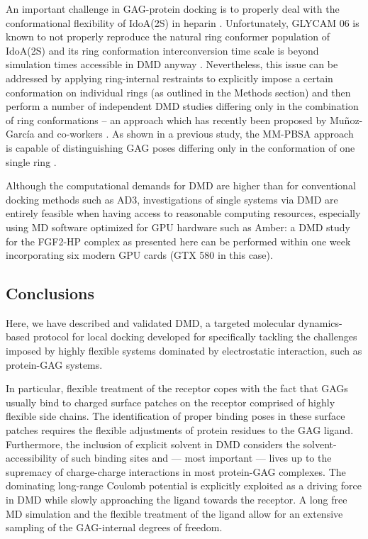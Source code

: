 An important challenge in GAG-protein docking is to properly deal with the
conformational flexibility of IdoA(2S) in heparin
\cite{Mulloy_dyn_conf_heparin_2000, barbero_jacs_2005}. Unfortunately, GLYCAM 06
is known to not properly reproduce the natural ring conformer population of
IdoA(2S) \cite{gandhi_idoa2s_2010} and its ring conformation interconversion
time scale is beyond simulation times accessible in DMD anyway
\cite{almond_jacs_2010}. Nevertheless, this issue can be addressed by applying
ring-internal restraints to explicitly impose a certain conformation on
individual rings (as outlined in the Methods section) and then perform a number
of independent DMD studies differing only in the combination of ring
conformations -- an approach which has recently been proposed by Muñoz-García
and co-workers {\cite{conf_idoa_timeavg_restraints_2013}}. As shown in a
previous study, the MM-PBSA approach is capable of distinguishing GAG poses
differing only in the conformation of one single ring
\cite{Samsonov_rings_cr_2013}.

Although the computational demands for DMD are higher than for conventional
docking methods such as AD3, investigations of single systems via DMD are
entirely feasible when having access to reasonable computing resources,
especially using MD software optimized for GPU hardware such as Amber: a DMD
study for the FGF2-HP complex as presented here can be performed within one week
incorporating six modern GPU cards (GTX 580 in this case).

\subsection{Conclusions}

Here, we have described and validated DMD, a targeted molecular dynamics-based
protocol for local docking developed for specifically tackling the challenges
imposed by highly flexible systems dominated by electrostatic interaction, such
as protein-GAG systems.

In particular, flexible treatment of the receptor copes with the fact that GAGs
usually bind to charged surface patches on the receptor comprised of highly
flexible side chains. The identification of proper binding poses in these
surface patches requires the flexible adjustments of protein residues to the GAG
ligand. Furthermore, the inclusion of explicit solvent in DMD considers the
solvent-accessibility of such binding sites and --- most important --- lives up
to the supremacy of charge-charge interactions in most protein-GAG complexes.
The dominating long-range Coulomb potential is explicitly exploited as a driving
force in DMD while slowly approaching the ligand towards the receptor. A long
free MD simulation and the flexible treatment of the ligand allow for an
extensive sampling of the GAG-internal degrees of freedom.

